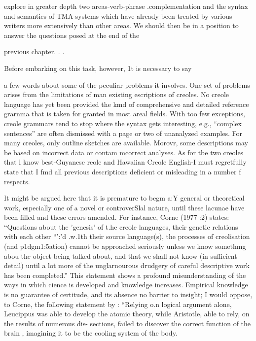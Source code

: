 
explore in greater depth two areas-verb-phrase .complementation and the syntax and semantics of TMA systems-which have already been treated by various writers more extensively than other areas. We should then be in a position to answer the questions posed at the end of the

previous chapter. . .

Before embarking on this task, however, 1t is necessary to say

a few words about some of the peculiar problems it involves. One set of problems arises from the limitations of man existing escriptions of creoles. No creole language has yet been provided the kmd of com\-prehensive and detailed reference grarnma that is taken for granted in most areal fields. With too few exceptions, creole grammars tend to stop where the syntax gets interesting, e.g., ``complex sentences'' are often dismissed with a page or two of unanalyzed examples. For many creoles, only outline sketches are available. Morovr, some descriptions may be based on incorrect data or contam mcorrect analyses. As for tbe two creoles that l know best-Guyanese reole and Hawaiian Creole English-I must regretfully state that I fmd all previous descriptions deficient or misleading in a number f respects.

It might be argued here that it is premature to begm a:{\textquotedbl}Y general or theoretical work, especially one of a novel or controverSlal nature, until these lacunae have been filled and these errors amended. For instance, Corne (1977 :2) states: ``Questions about the 'genesis' of t.he creole languages, their genetic relations with each other ``':'d .w.1th their source language(s), the processes of creolisation (and p1dgm1:5a\-tion) cannot be approached seriously unless we know somethmg abou the object being talked about, and that we shall not know (in sufficient detail) until a lot more of the unglarnourous drudgery of careful descriptive work has been completed.'' This statement shows a profound misunderstanding of the ways in which cience is developed and knowledge increases. Empirical knowledge is no guarantee of certitude, and its absence no barrier to insight; I would oppose, to Corne, the following statement by \citet[3]{Dingwall1979}: ``Relying o.n logical argument alone, Leucippus was able to develop the atomic theory, while Aristotle, able to rely, on the results of numerous dis-
sections, failed to discover the correct function of the brain , imagining it to be the cooling system of the body.{\textquotedbl}

